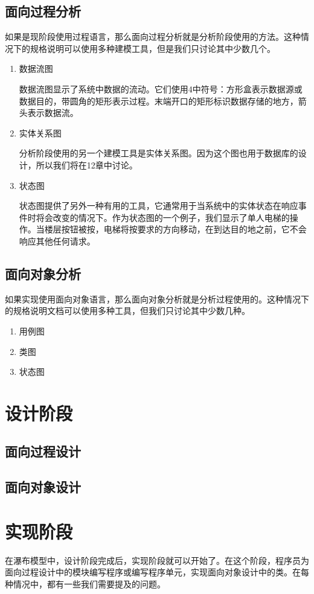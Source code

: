 \subsection{面向过程分析}
如果是现阶段使用过程语言，那么面向过程分析就是分析阶段使用的方法。这种情况下的规格说明可以使用多种建模工具，但是我们只讨论其中少数几个。
\begin{enumerate}
	\item 数据流图

	数据流图显示了系统中数据的流动。它们使用4中符号：方形盒表示数据源或数据目的，带圆角的矩形表示过程。末端开口的矩形标识数据存储的地方，箭头表示数据流。
	\item 实体关系图

	分析阶段使用的另一个建模工具是实体关系图。因为这个图也用于数据库的设计，所以我们将在12章中讨论。
	\item 状态图

	状态图提供了另外一种有用的工具，它通常用于当系统中的实体状态在响应事件时将会改变的情况下。作为状态图的一个例子，我们显示了单人电梯的操作。当楼层按钮被按，电梯将按要求的方向移动，在到达目的地之前，它不会响应其他任何请求。
\end{enumerate}
\subsection{面向对象分析}
如果实现使用面向对象语言，那么面向对象分析就是分析过程使用的。这种情况下的规格说明文档可以使用多种工具，但我们只讨论其中少数几种。
\begin{enumerate}
	\item 用例图
	\item 类图
	\item 状态图
\end{enumerate}
\section{设计阶段}
\subsection{面向过程设计}
\subsection{面向对象设计}
\section{实现阶段}
在瀑布模型中，设计阶段完成后，实现阶段就可以开始了。在这个阶段，程序员为面向过程设计中的模块编写程序或编写程序单元，实现面向对象设计中的类。在每种情况中，都有一些我们需要提及的问题。
